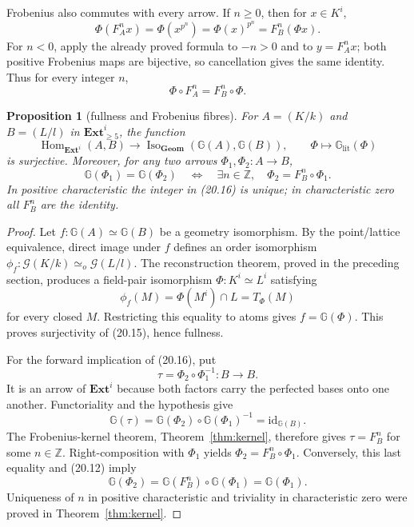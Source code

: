 \documentclass[11pt,oneside]{article}
\newtheorem{proposition}[theorem]{Proposition}
\theoremstyle{definition}
\theoremstyle{remark}
\newcommand{\G}{\mathcal{G}}
\begin{document}
Frobenius also commutes with every arrow.  If $n\geq0$, then for $x\in K^i$,
\[
 \Phi(F_A^n x)=\Phi(x^{p^n})=\Phi(x)^{p^n}=F_B^n(\Phi x).      \tag{20.13}
\]
For $n<0$, apply the already proved formula to $-n>0$ and to
$y=F_A^n x$; both positive Frobenius maps are bijective, so cancellation gives the same
identity.  Thus for every integer $n$,
\[
 \Phi\circ F_A^n=F_B^n\circ\Phi.                              \tag{20.14}
\]

\begin{proposition}[fullness and Frobenius fibres]
\label{prop:hom-fibres}
For $A=(K/k)$ and $B=(L/l)$ in $\mathbf{Ext}^{i}_{\geq5}$, the function
\[
 \operatorname{Hom}_{\mathbf{Ext}^{i}}(A,B)
 \longrightarrow
 \operatorname{Iso}_{\mathbf{Geom}}
       (\mathbb G(A),\mathbb G(B)),\qquad
 \Phi\longmapsto\mathbb G_{\mathrm{lit}}(\Phi)               \tag{20.15}
\]
is surjective.  Moreover, for any two arrows $\Phi_1,\Phi_2:A\to B$,
\[
 \mathbb G(\Phi_1)=\mathbb G(\Phi_2)
 \quad\Longleftrightarrow\quad
 \exists n\in\mathbb Z,\quad \Phi_2=F_B^n\circ\Phi_1.        \tag{20.16}
\]
In positive characteristic the integer in (20.16) is unique; in characteristic zero all
$F_B^n$ are the identity.
\end{proposition}
\begin{proof}
Let $f:\mathbb G(A)\simeq\mathbb G(B)$ be a geometry isomorphism.  By the
point/lattice equivalence, direct image under $f$ defines an order isomorphism
$\phi_f:\G(K/k)\simeq_o\G(L/l)$.  The reconstruction theorem, proved in the preceding
section, produces a field-pair isomorphism $\Phi:K^i\simeq L^i$ satisfying
\[
 \phi_f(M)=\Phi(M^i)\cap L=T_\Phi(M)
\]
for every closed $M$.  Restricting this equality to atoms gives
$f=\mathbb G(\Phi)$.  This proves surjectivity of (20.15), hence fullness.

For the forward implication of (20.16), put
\[
 \tau=\Phi_2\circ\Phi_1^{-1}:B\longrightarrow B.
\]
It is an arrow of $\mathbf{Ext}^{i}$ because both factors carry the perfected bases onto
one another.  Functoriality and the hypothesis give
\[
 \mathbb G(\tau)
 =\mathbb G(\Phi_2)\circ\mathbb G(\Phi_1)^{-1}
 =\mathrm{id}_{\mathbb G(B)}.
\]
The Frobenius-kernel theorem, Theorem~\ref{thm:kernel}, therefore gives
$\tau=F_B^n$ for some $n\in\mathbb Z$.  Right-composition with $\Phi_1$ yields
$\Phi_2=F_B^n\circ\Phi_1$.  Conversely, this last equality and (20.12) imply
\[
 \mathbb G(\Phi_2)=\mathbb G(F_B^n)\circ\mathbb G(\Phi_1)
                   =\mathbb G(\Phi_1).
\]
Uniqueness of $n$ in positive characteristic and triviality in characteristic zero were
proved in Theorem~\ref{thm:kernel}.
\end{proof}
\end{document}
